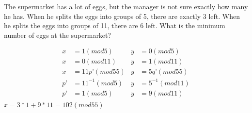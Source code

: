 \question The supermarket has a lot of eggs, but the manager is not sure exactly how many he has. When he splits the eggs into groups of 5, there are exactly 3 left. When he splits the eggs into groups of 11, there are 6 left. What is the minimum number of eggs at the supermarket?
\begin{solution}[1.5 in]
\begin{align*}
x&=1(mod  5) & y&=0(mod  5) \\
x &= 0 (mod  11) & y &= 1 (mod  11) \\
x &= 11p’ (mod  55) & y &= 5q’ (mod  55) \\
p’ &= 11^{-1} (mod  5) & y &= 5^{-1} (mod  11) \\
p’ &= 1 (mod  5) & y &= 9 (mod  11) \\
\end{align*}
$x = 3 * 1 + 9 * 11 = 102 (mod  55)$ \\
\end{solution}
